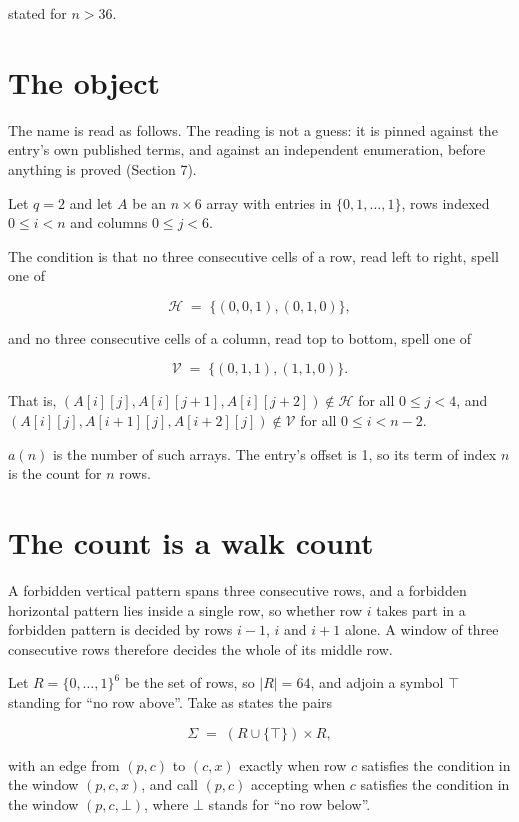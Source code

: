 \documentclass[11pt]{article}
\theoremstyle{definition}
\begin{document}
stated for $n > 36$.

\section{The object}

The name is read as follows. The reading is not a guess: it is pinned against the entry's own published terms, and against an independent enumeration, before anything is proved (Section 7).

Let $q = 2$ and let $A$ be an $n \times 6$ array with entries in $\{0,1,\dots,1\}$, rows indexed $0 \le i < n$ and columns $0 \le j < 6$.

The condition is that no three consecutive cells of a row, read left to right, spell one of

\[\mathcal{H} \;=\; \{(0,0,1), (0,1,0)\},\]

and no three consecutive cells of a column, read top to bottom, spell one of

\[\mathcal{V} \;=\; \{(0,1,1), (1,1,0)\}.\]

That is, $(A[i][j],A[i][j{+}1],A[i][j{+}2]) \notin \mathcal{H}$ for all $0 \le j < 4$, and $(A[i][j],A[i{+}1][j],A[i{+}2][j]) \notin \mathcal{V}$ for all $0 \le i < n-2$.

$a(n)$ is the number of such arrays. The entry's offset is 1, so its term of index $n$ is the count for $n$ rows.

\section{The count is a walk count}

A forbidden vertical pattern spans three consecutive rows, and a forbidden horizontal pattern lies inside a single row, so whether row $i$ takes part in a forbidden pattern is decided by rows $i-1$, $i$ and $i+1$ alone. A window of three consecutive rows therefore decides the whole of its middle row.

Let $R = \{0,\dots,1\}^{6}$ be the set of rows, so $|R| = 64$, and adjoin a symbol $\top$ standing for ``no row above''. Take as states the pairs

\[\Sigma \;=\; (R \cup \{\top\}) \times R,\]

with an edge from $(p,c)$ to $(c,x)$ exactly when row $c$ satisfies the condition in the window $(p,c,x)$, and call $(p,c)$ accepting when $c$ satisfies the condition in the window $(p,c,\bot)$, where $\bot$ stands for ``no row below''.
\end{document}

